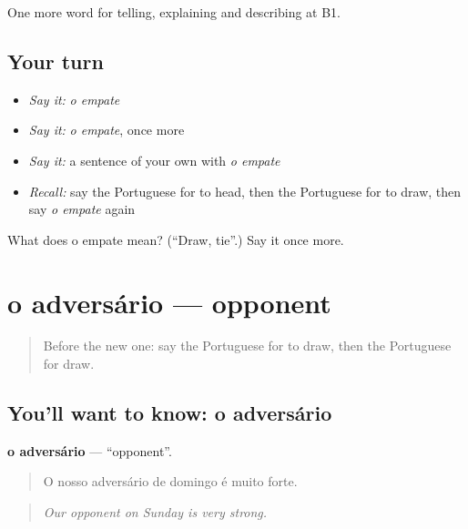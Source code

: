 \begin{grammarlens}[title={What you've built}]
One more word for telling, explaining and describing at B1.
\end{grammarlens}

\subsection*{Your turn}
\begin{itemize}
\raggedright
  \item \emph{Say it:} \emph{o empate}
  \item \emph{Say it:} \emph{o empate}, once more
  \item \emph{Say it:} a sentence of your own with \emph{o empate}
  \item \emph{Recall:} say the Portuguese for to head, then the Portuguese for to draw, then say \emph{o empate} again
\end{itemize}

\begin{tcolorbox}[breakable,colback=teal!4,colframe=teal!35!black,title={Before you move on}]
What does o empate mean? (\textquotedblleft{}Draw, tie\textquotedblright{}.) Say it once more.
\end{tcolorbox}
\section[o adversário]{o adversário — opponent}

\label{lesson:PT-C510-adversario}



\begin{quote}
Before the new one: say the Portuguese for to draw, then the Portuguese for draw.
\end{quote}

\subsection*{You'll want to know: o adversário}
\textbf{o adversário} — \textquotedblleft{}opponent\textquotedblright{}.

\begin{quote}
O nosso adversário de domingo é muito forte.
\end{quote}

\begin{quote}
\emph{Our opponent on Sunday is very strong.}
\end{quote}

